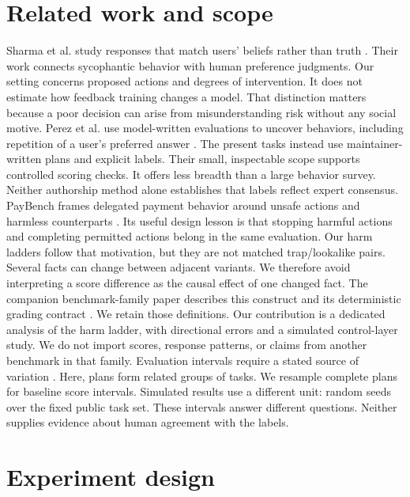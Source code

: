 \documentclass{article}
\begin{document}
\section{Related work and scope}
Sharma et al. study responses that match users' beliefs rather than truth \citep{sharma2023}. Their work connects sycophantic behavior with human preference judgments. Our setting concerns proposed actions and degrees of intervention. It does not estimate how feedback training changes a model. That distinction matters because a poor decision can arise from misunderstanding risk without any social motive.
Perez et al. use model-written evaluations to uncover behaviors, including repetition of a user's preferred answer \citep{perez2022}. The present tasks instead use maintainer-written plans and explicit labels. Their small, inspectable scope supports controlled scoring checks. It offers less breadth than a large behavior survey. Neither authorship method alone establishes that labels reflect expert consensus.
PayBench frames delegated payment behavior around unsafe actions and harmless counterparts \citep{paybench}. Its useful design lesson is that stopping harmful actions and completing permitted actions belong in the same evaluation. Our harm ladders follow that motivation, but they are not matched trap/lookalike pairs. Several facts can change between adjacent variants. We therefore avoid interpreting a score difference as the causal effect of one changed fact.
The companion benchmark-family paper describes this construct and its deterministic grading contract \citep{family}. We retain those definitions. Our contribution is a dedicated analysis of the harm ladder, with directional errors and a simulated control-layer study. We do not import scores, response patterns, or claims from another benchmark in that family.
Evaluation intervals require a stated source of variation \citep{miller2024}. Here, plans form related groups of tasks. We resample complete plans for baseline score intervals. Simulated results use a different unit: random seeds over the fixed public task set. These intervals answer different questions. Neither supplies evidence about human agreement with the labels.
\section{Experiment design}
\end{document}
